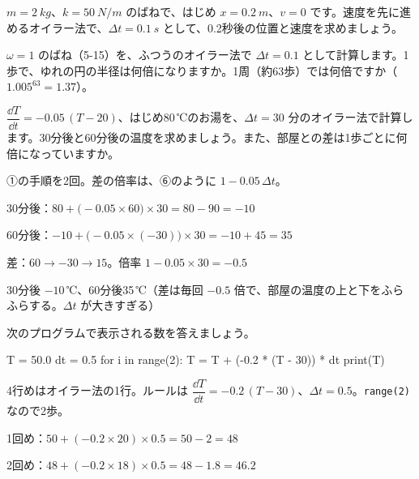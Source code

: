 \begingroup{}%
\noindent\begin{minipage}[t]{0.49\linewidth}
\begin{jibun}
\raggedright $m=\qty{2}{kg}$、$k=\qty{50}{N/m}$ のばねで、はじめ $x=\qty{0.2}{m}$、$v=0$ です。速度を先に進めるオイラー法で、$\Delta t=\qty{0.1}{s}$ として、0.2秒後の位置と速度を求めましょう。
\end{jibun}
\end{minipage}\hfill
\begin{minipage}[t]{0.49\linewidth}
\begin{jibun}
\raggedright $\omega=1$ のばね（5-15）を、ふつうのオイラー法で $\Delta t=0.1$ として計算します。1歩で、ゆれの円の半径は何倍になりますか。1周（約63歩）では何倍ですか（$1.005^{63}=1.37$）。
\end{jibun}
\end{minipage}\par
\endgroup


\begin{reidai}
$\dfrac{\dd T}{\dd t}=-0.05\,(T-20)$、はじめ80\,℃のお湯を、$\Delta t=30$ 分のオイラー法で計算します。30分後と60分後の温度を求めましょう。また、部屋との差は1歩ごとに何倍になっていますか。\par
\kangaekata ①の手順を2回。差の倍率は、⑥のように $1-0.05\,\Delta t$。\par
\shiki 30分後：$80+\bigl(-0.05\times60\bigr)\times30=80-90=-10$\par
\bkvicl 60分後：$-10+\bigl(-0.05\times(-30)\bigr)\times30=-10+45=35$\par
\bkvicl 差：$60\to-30\to15$。倍率 $1-0.05\times30=-0.5$\par
\kotae 30分後 $-10$\,℃、60分後35\,℃（差は毎回 $-0.5$ 倍で、部屋の温度の上と下をふらふらする。$\Delta t$ が大きすぎる）
\end{reidai}

\begin{reidai}[プログラムを読む]
次のプログラムで表示される数を答えましょう。\par\vspace{2pt}
\begin{bkcode}
T = 50.0
dt = 0.5
for i in range(2):
    T = T + (-0.2 * (T - 30)) * dt
print(T)
\end{bkcode}
\kangaekata 4行めはオイラー法の1行。ルールは $\dfrac{\dd T}{\dd t}=-0.2\,(T-30)$、$\Delta t=0.5$。\texttt{range(2)} なので2歩。\par
\shiki 1回め：$50+(-0.2\times20)\times0.5=50-2=48$\par
\bkvicl 2回め：$48+(-0.2\times18)\times0.5=48-1.8=46.2$\par
{}
\end{reidai}

